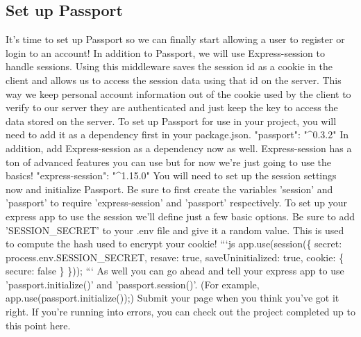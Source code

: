\documentclass{article}%
\begin{document}
\subsection{Set up Passport}%
\label{subsec:SetupPassport}%
It's time to set up Passport so we can finally start allowing a user to register or login to an account! In addition to Passport, we will use Express{-}session to handle sessions. Using this middleware saves the session id as a cookie in the client and allows us to access the session data using that id on the server. This way we keep personal account information out of the cookie used by the client to verify to our server they are authenticated and just keep the key to access the data stored on the server.\newline%
To set up Passport for use in your project, you will need to add it as a dependency first in your package.json. "passport": "\^{}0.3.2"\newline%
In addition, add Express{-}session as a dependency now as well. Express{-}session has a ton of advanced features you can use but for now we're just going to use the basics! "express{-}session": "\^{}1.15.0"\newline%
You will need to set up the session settings now and initialize Passport. Be sure to first create the variables 'session' and 'passport' to require 'express{-}session' and 'passport' respectively.\newline%
To set up your express app to use the session we'll define just a few basic options. Be sure to add 'SESSION\_SECRET' to your .env file and give it a random value. This is used to compute the hash used to encrypt your cookie!\newline%
```js\newline%
app.use(session(\{\newline%
  secret: process.env.SESSION\_SECRET,\newline%
  resave: true,\newline%
  saveUninitialized: true,\newline%
  cookie: \{ secure: false \}\newline%
\}));\newline%
```\newline%
As well you can go ahead and tell your express app to use 'passport.initialize()' and 'passport.session()'. (For example, app.use(passport.initialize());)\newline%
Submit your page when you think you've got it right. If you're running into errors, you can check out the project completed up to this point here.\newline%
\end{document}
